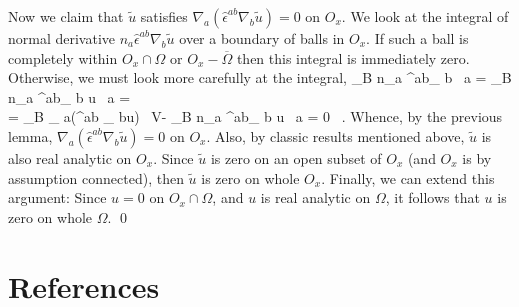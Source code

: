 \documentclass[12pt]{iopart}
\newcommand{\dd}{\partial}
\newcommand{\nab}[1]{\nabla_{\! #1}}
\newcommand{\vol}{\df V}
\newcommand{\df}{\mathrm{d}}
\def\bal#1\eal{\begin{align}#1\end{align}}
\newcommand{\0}{\vct{0}}
\newcommand{\cl}[1]{\overline{#1}}
\theoremstyle{plain} \newtheorem{tm}{Theorem}[section]
\theoremstyle{plain} \newtheorem{lm}[tm]{Lemma}
\theoremstyle{definition} \newtheorem{defn}[tm]{Definition}
\begin{document}
Now we claim that $\tilde{u}$ satisfies $\nab{a}(\hat{\epsilon}^{ab}\nab{b}\tilde{u}) = 0$ on $O_x$. We look at the integral of normal derivative $n_a \hat{\epsilon}^{ab} \nab{b} \tilde{u}$ over a boundary of balls in $O_x$. If such a ball is completely within $O_x \cap \Omega$ or $O_x - \cl{\Omega}$ then this integral is immediately zero. Otherwise, we must look more carefully at the integral,
\bal
\oint_{\dd B} \!\! n_a \hat{\epsilon}^{ab}\nab{b} \, \df a = \int_{\dd B \cap \Omega} \!\! n_a \hat{\epsilon}^{ab}\nab{b} u \, \df a = \nonumber\\
= \int_{B \cap \Omega} \!\!\! \nab{a}(\hat{\epsilon}^{ab} \nab{b}u) \, \vol - \oint_{B \cap \dd\Omega} \!\!\! n_a \hat{\epsilon}^{ab}\nab{b} u \, \df a = 0 \ .
\eal
Whence, by the previous lemma, $\nab{a}(\hat{\epsilon}^{ab}\nab{b}\tilde{u}) = 0$ on $O_x$. Also, by classic results mentioned above, $\tilde{u}$ is also real analytic on $O_x$. Since $\tilde{u}$ is zero on an open subset of $O_x$ (and $O_x$ is by assumption connected), then $\tilde{u}$ is zero on whole $O_x$. Finally, we can extend this argument: Since $u = 0$ on $O_x \cap \Omega$, and $u$ is real analytic on $\Omega$, it follows that $u$ is zero on whole $\Omega$. \qed







\section*{References}



\end{document}
